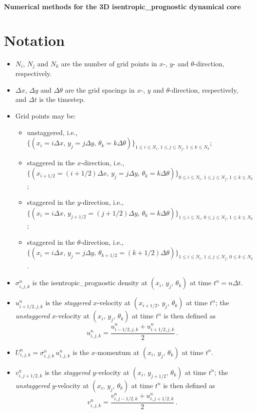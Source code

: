 \documentclass{article}
\numberwithin{equation}{section}
\begin{document}
	\noindent \textbf{\LARGE{Numerical methods for the 3D isentropic_prognostic dynamical core}}
	\normalsize

	\section{Notation}
		\begin{itemize}
			\item $N_i$, $N_j$ and $N_{k}$ are the number of grid points in $x$-, $y$- and $\theta$-direction, respectively.
			\item $\Delta x$, $\Delta y$ and $\Delta \theta$ are the grid spacings in $x$-, $y$ and $\theta$-direction, respectively, and $\Delta t$ is the timestep.
			\item Grid points may be:
				\begin{itemize}
					\item unstaggered, i.e., $\lbrace (x_i = i \Delta x, \, y_j = j \Delta y, \, \theta_k = k \Delta \theta) \rbrace_{1 \leq i \leq N_i, \, 1 \leq j \leq N_j, \, 1 \leq k \leq N_k}$;
					\item staggered in the $x$-direction, i.e., $\lbrace (x_{i+1/2} = (i + 1/2) \Delta x, \, y_j = j \Delta y, \, \theta_k = k \Delta \theta) \rbrace_{0 \leq i \leq N_i, \, 1 \leq j \leq N_j, \, 1 \leq k \leq N_k}$;
					\item staggered in the $y$-direction, i.e., $\lbrace (x_i = i \Delta x, \, y_{j + 1/2} = (j + 1/2) \Delta y, \, \theta_k = k \Delta \theta) \rbrace_{1 \leq i \leq N_i, \, 0 \leq j \leq N_j, \, 1 \leq k \leq N_k}$;
					\item staggered in the $\theta$-direction, i.e., $\lbrace (x_i = i \Delta x, \, y_j = j \Delta y, \, \theta_{k+1/2} = (k + 1/2) \Delta \theta) \rbrace_{1 \leq i \leq N_i, \, 1 \leq j \leq N_j, \, 0 \leq k \leq N_k}$.
				\end{itemize}
			\item $\sigma_{i,j,k}^n$ is the isentropic_prognostic density at $(x_i, \, y_j, \, \theta_k)$ at time $t^n = n \Delta t$.
			\item $u_{i+1/2,j,k}^n$ is the \emph{staggered} $x$-velocity at $(x_{i+1/2}, \, y_j, \, \theta_k)$ at time $t^n$; the \emph{unstaggered} $x$-velocity at $(x_i, \, y_j, \, \theta_k)$ at time $t^n$ is then defined as \[ u_{i,j,k}^n = \dfrac{u_{i-1/2,j,k}^n + u_{i+1/2,j,k}^n}{2} \, . \]
			\item $U_{i,j,k}^n = \sigma_{i,j,k}^n \, u_{i,j,k}^n$ is the $x$-momentum at $(x_i, \, y_j, \, \theta_k)$ at time $t^n$.
			\item $v_{i,j+1/2,k}^n$ is the \emph{staggered} $y$-velocity at $(x_i, \, y_{j+1/2}, \, \theta_k)$ at time $t^n$; the \emph{unstaggered} $y$-velocity at $(x_i, \, y_j, \, \theta_k)$ at time $t^n$ is then defined as \[ v_{i,j,k}^n = \dfrac{v_{i,j-1/2,k}^n + u_{i,j+1/2,k}^n}{2} \, . \]

\end{itemize}
\end{document}
